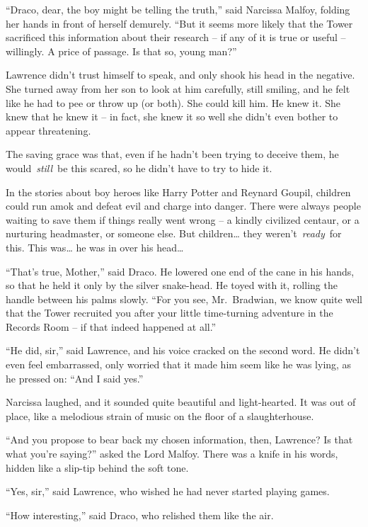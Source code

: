 ``Draco, dear, the boy might be telling the truth,'' said Narcissa
Malfoy, folding her hands in front of herself demurely. ``But it seems
more likely that the Tower sacrificed this information about their
research -- if any of it is true or useful -- willingly. A price of
passage. Is that so, young man?''

Lawrence didn't trust himself to speak, and only shook his head in the
negative. She turned away from her son to look at him carefully, still
smiling, and he felt like he had to pee or throw up (or both). She could
kill him. He knew it. She knew that he knew it -- in fact, she knew it
so well she didn't even bother to appear threatening.

The saving grace was that, even if he hadn't been trying to deceive
them, he would~\emph{still}~be this scared, so he didn't have to try to
hide it.

In the stories about boy heroes like Harry Potter and Reynard Goupil,
children could run amok and defeat evil and charge into danger. There
were always people waiting to save them if things really went wrong -- a
kindly civilized centaur, or a nurturing headmaster, or someone else.
But children\ldots{} they weren't~\emph{ready}~for this. This
was\ldots{} he was in over his head\ldots{}

``That's true, Mother,'' said Draco. He lowered one end of the cane in
his hands, so that he held it only by the silver snake-head. He toyed
with it, rolling the handle between his palms slowly. ``For you see,
Mr.~Bradwian, we know quite well that the Tower recruited you after your
little time-turning adventure in the Records Room -- if that indeed
happened at all.''

``He did, sir,'' said Lawrence, and his voice cracked on the second
word. He didn't even feel embarrassed, only worried that it made him
seem like he was lying, as he pressed on: ``And I said yes.''

Narcissa laughed, and it sounded quite beautiful and light-hearted. It
was out of place, like a melodious strain of music on the floor of a
slaughterhouse.

``And you propose to bear back my chosen information, then, Lawrence? Is
that what you're saying?'' asked the Lord Malfoy. There was a knife in
his words, hidden like a slip-tip behind the soft tone.

``Yes, sir,'' said Lawrence, who wished he had never started playing
games.

``How interesting,'' said Draco, who relished them like the air.

